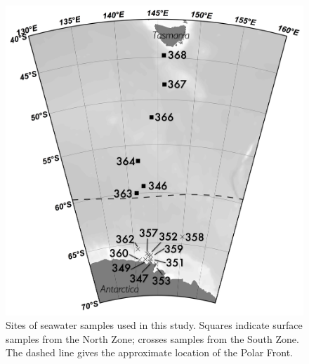 \begin{figure}
  \centering
  \includegraphics[width=\textwidth]{../polarfront/samplemap.png}
  \caption[Map showing sites of seawater samples used in the Polar Front study]{Sites of seawater samples used in this study. Squares indicate surface samples from the North Zone; crosses samples from the South Zone. The dashed line gives the approximate location of the Polar Front.}
  \label{fig:samplemap}
\end{figure}
